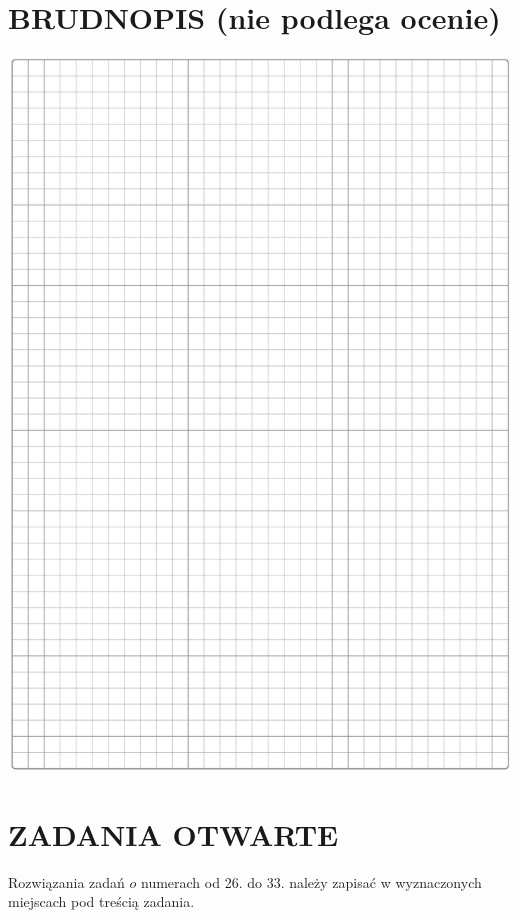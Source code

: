 \documentclass[10pt]{article}
\begin{document}
\section*{BRUDNOPIS (nie podlega ocenie)}
\begin{center}
\includegraphics[max width=\textwidth]{2024_11_21_fd9e49107d1ddcec5cd8g-07}
\end{center}

\section*{ZADANIA OTWARTE}
Rozwiązania zadań \(o\) numerach od 26. do 33. należy zapisać w wyznaczonych miejscach pod treścią zadania.
\end{document}
